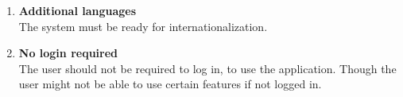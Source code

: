 \begin{enumerate}
  \item\label{req:additionallanguages} \textbf{Additional languages} \\
    The system must be ready for internationalization.
  
  \item\label{req:Nologinrequired} \textbf{No login required} \\
    The user should not be required to log in, to use the application. Though the user might not be able to use certain features if not logged in.
\end{enumerate}